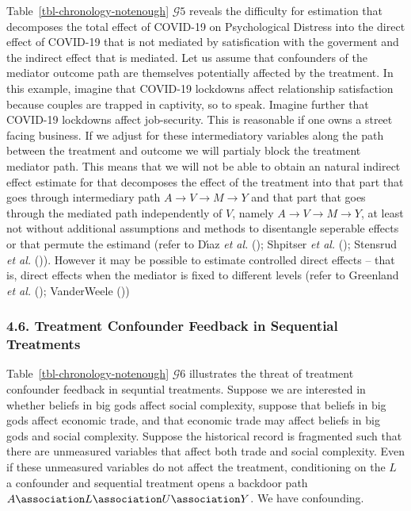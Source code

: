 \documentclass[
  single column]{article}
\begin{document}
Table~\ref{tbl-chronology-notenough} \(\mathcal{G} 5\) reveals the
difficulty for estimation that decomposes the total effect of COVID-19
on Psychological Distress into the direct effect of COVID-19 that is not
mediated by satisfication with the goverment and the indirect effect
that is mediated. Let us assume that confounders of the mediator outcome
path are themselves potentially affected by the treatment. In this
example, imagine that COVID-19 lockdowns affect relationship
satisfaction because couples are trapped in captivity, so to speak.
Imagine further that COVID-19 lockdowns affect job-security. This is
reasonable if one owns a street facing business. If we adjust for these
intermediatory variables along the path between the treatment and
outcome we will partialy block the treatment mediator path. This means
that we will not be able to obtain an natural indirect effect estimate
for that decomposes the effect of the treatment into that part that goes
through intermediary path \(A \to V \to M \to Y\) and that part that
goes through the mediated path independently of \(V\), namely
\(A \to V \to M \to Y\), at least not without additional assumptions and
methods to disentangle seperable effects or that permute the estimand
(refer to Dı́az \emph{et al.} (); Shpitser
\emph{et al.} (); Stensrud
\emph{et al.} ()). However
it may be possible to estimate controlled direct effects -- that is,
direct effects when the mediator is fixed to different levels (refer to
Greenland \emph{et al.} ();
VanderWeele ())

\subsubsection{4.6. Treatment Confounder Feedback in Sequential
Treatments}\label{treatment-confounder-feedback-in-sequential-treatments}

Table~\ref{tbl-chronology-notenough} \(\mathcal{G} 6\) illustrates the
threat of treatment confounder feedback in sequntial treatments. Suppose
we are interested in whether beliefs in big gods affect social
complexity, suppose that beliefs in big gods affect economic trade, and
that economic trade may affect beliefs in big gods and social
complexity. Suppose the historical record is fragmented such that there
are unmeasured variables that affect both trade and social complexity.
Even if these unmeasured variables do not affect the treatment,
conditioning on the \(L\) a confounder and sequential treatment opens a
backdoor path \(A \association L \association U \association Y\). We
have confounding.
\end{document}
